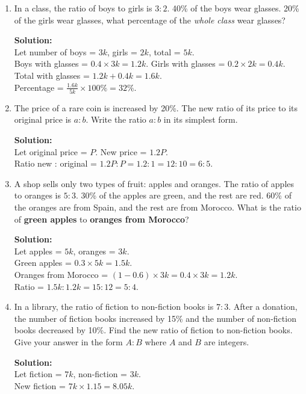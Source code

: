 \documentclass[12pt,a4paper]{article}
\begin{document}
\begin{enumerate}[start=21]

\item In a class, the ratio of boys to girls is \( 3:2 \). 40\% of the boys wear glasses. 20\% of the girls wear glasses, what percentage of the \textit{whole class} wear glasses?

\textbf{Solution:}\\
Let number of boys = \( 3k \), girls = \( 2k \), total = \( 5k \).\\
Boys with glasses = \( 0.4 \times 3k = 1.2k \). Girls with glasses = \( 0.2 \times 2k = 0.4k \).\\
Total with glasses = \( 1.2k + 0.4k = 1.6k \).\\
Percentage = \( \frac{1.6k}{5k} \times 100\% = 32\% \).

\item The price of a rare coin is increased by 20\%. The new ratio of its price to its original price is \( a : b \). Write the ratio \( a:b \) in its simplest form.

\textbf{Solution:}\\
Let original price = \( P \). New price = \( 1.2P \).\\
Ratio new : original = \( 1.2P : P = 1.2:1 = 12:10 = 6:5 \).

\item A shop sells only two types of fruit: apples and oranges. The ratio of apples to oranges is \( 5:3 \). 30\% of the apples are green, and the rest are red. 60\% of the oranges are from Spain, and the rest are from Morocco. What is the ratio of \textbf{green apples} to \textbf{oranges from Morocco}?

\textbf{Solution:}\\
Let apples = \( 5k \), oranges = \( 3k \).\\
Green apples = \( 0.3 \times 5k = 1.5k \).\\
Oranges from Morocco = \( (1 - 0.6) \times 3k = 0.4 \times 3k = 1.2k \).\\
Ratio = \( 1.5k : 1.2k = 15:12 = 5:4 \).

\item In a library, the ratio of fiction to non-fiction books is \( 7:3 \). After a donation, the number of fiction books increased by 15\% and the number of non-fiction books decreased by 10\%. Find the new ratio of fiction to non-fiction books. Give your answer in the form \( A:B \) where \( A \) and \( B \) are integers.

\textbf{Solution:}\\
Let fiction = \( 7k \), non-fiction = \( 3k \).\\
New fiction = \( 7k \times 1.15 = 8.05k \).\\

\end{enumerate}
\end{document}
